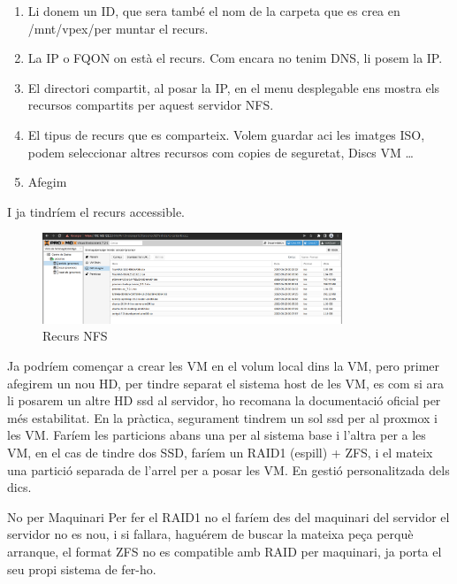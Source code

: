 \documentclass[
  10pt,
]{krantz}
\providecommand{\tightlist}{%
  \setlength{\itemsep}{0pt}\setlength{\parskip}{0pt}}
\begin{document}
\begin{enumerate}
\def\labelenumi{\arabic{enumi}.}
\tightlist
\item
  Li donem un ID, que sera també el nom de la carpeta que es crea en /mnt/vpex/per muntar el recurs.
\item
  La IP o FQON on està el recurs. Com encara no tenim DNS, li posem la IP.
\item
  El directori compartit, al posar la IP, en el menu desplegable ens mostra els recursos compartits per aquest servidor NFS.
\item
  El tipus de recurs que es comparteix. Volem guardar aci les imatges ISO, podem seleccionar altres recursos com copies de seguretat, Discs VM \ldots{}
\item
  Afegim
\end{enumerate}

I ja tindríem el recurs accessible.

\begin{figure}
\centering
\includegraphics[width=0.8\textwidth,height=\textheight]{imatges/proxmox/proxmox_enm4.png}
\caption{Recurs NFS}
\end{figure}

Ja podríem començar a crear les VM en el volum local dins la VM, pero primer afegirem un nou HD, per tindre separat el sistema host de les VM, es com si ara li posarem un altre HD ssd al servidor, ho recomana la documentació oficial per més estabilitat. En la pràctica, segurament tindrem un sol ssd per al proxmox i les VM. Faríem les particions abans una per al sistema base i l'altra per a les VM, en el cas de tindre dos SSD, faríem un RAID1 (espill) + ZFS, i el mateix una partició separada de l'arrel per a posar les VM. En gestió personalitzada dels dics.

\begin{rmdwarn}{No per Maquinari}
Per fer el RAID1 no el faríem des del maquinari del servidor el servidor no es nou, i si fallara, haguérem de buscar la mateixa peça perquè arranque, el format ZFS no es compatible amb RAID per maquinari, ja porta el seu propi sistema de fer-ho.

\end{rmdwarn}
\end{document}
